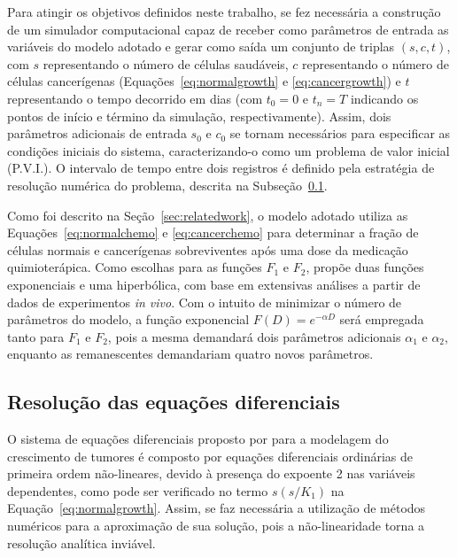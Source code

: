 \documentclass[12pt]{article}
\begin{document}
Para atingir os objetivos definidos neste trabalho, se fez necessária a construção de um simulador computacional capaz de receber como parâmetros de entrada as variáveis do modelo adotado e gerar como saída um conjunto de triplas $(s, c, t)$, com $s$ representando o número de células saudáveis, $c$ representando o número de células cancerígenas (Equações~\ref{eq:normalgrowth} e \ref{eq:cancergrowth}) e $t$ representando o tempo decorrido em dias (com $t_{0} = 0$ e $t_{n} = T$ indicando os pontos de início e término da simulação, respectivamente).
Assim, dois parâmetros adicionais de entrada $s_{0}$ e $c_{0}$ se tornam necessários para especificar as condições iniciais do sistema, caracterizando-o como um problema de valor inicial (P.V.I.). O intervalo de tempo entre dois registros é definido pela estratégia de resolução numérica do problema, descrita na Subseção~\ref{sec:numerical}.

Como foi descrito na Seção~\ref{sec:relatedwork}, o modelo adotado utiliza as Equações~\ref{eq:normalchemo} e \ref{eq:cancerchemo} para determinar a fração de células normais e cancerígenas sobreviventes após uma dose da medicação quimioterápica.
Como escolhas para as funções $F_1$ e $F_2$, \cite{Berenbaum1969} propõe duas funções exponenciais e uma hiperbólica, com base em extensivas análises a partir de dados de experimentos \textit{in vivo}. Com o intuito de minimizar o número de parâmetros do modelo, a função exponencial $F(D) = e^{- \alpha D}$ será empregada tanto para $F_1$ e $F_2$, pois a mesma demandará dois parâmetros adicionais $\alpha_1$ e $\alpha_2$, enquanto as remanescentes demandariam quatro novos parâmetros.

\subsection{Resolução das equações diferenciais} \label{sec:numerical}

O sistema de equações diferenciais proposto por \cite{Panetta1996} para a modelagem do crescimento de tumores é composto por equações diferenciais ordinárias de primeira ordem não-lineares, devido à presença do expoente 2 nas variáveis dependentes, como pode ser verificado no termo $s(s / K_1)$ na Equação~\ref{eq:normalgrowth}. Assim, se faz necessária a utilização de métodos numéricos para a aproximação de sua solução, pois a não-linearidade torna a resolução analítica inviável.
\end{document}
